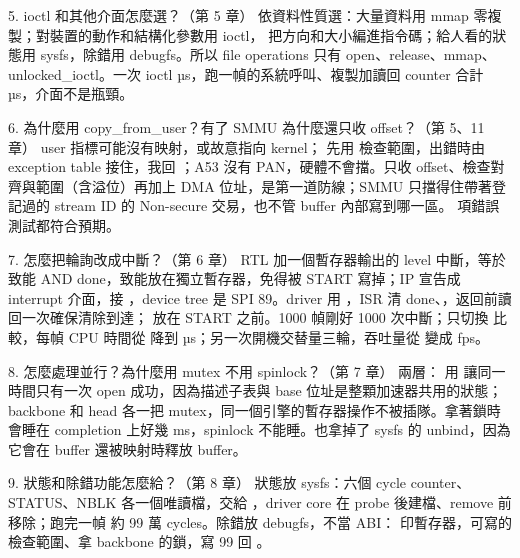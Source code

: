\begin{qashort}{5. ioctl 和其他介面怎麼選？（第 5 章）}
依資料性質選：大量資料用 mmap 零複製；對裝置的動作和結構化參數用 ioctl， 把方向和大小編進指令碼；給人看的狀態用 sysfs，除錯用 debugfs。所以 file operations 只有 open、release、mmap、unlocked\_ioctl。一次 ioctl \ioctlUs{} µs，跑一幀的系統呼叫、複製加讀回 counter 合計 \bbSysUs{} µs，介面不是瓶頸。
\end{qashort}

\begin{qashort}{6. 為什麼用 copy\_from\_user？有了 SMMU 為什麼還只收 offset？（第 5、11 章）}
user 指標可能沒有映射，或故意指向 kernel； 先用  檢查範圍，出錯時由 exception table 接住，我回 ；A53 沒有 PAN，硬體不會擋。只收 offset、檢查對齊與範圍（含溢位）再加上 DMA 位址，是第一道防線；SMMU 只擋得住帶著登記過的 stream ID 的 Non-secure 交易，也不管 buffer 內部寫到哪一區。\errChecks{} 項錯誤測試都符合預期。
\end{qashort}

\begin{qashort}{7. 怎麼把輪詢改成中斷？（第 6 章）}
RTL 加一個暫存器輸出的 level 中斷，等於致能 AND done，致能放在獨立暫存器，免得被 START 寫掉；IP 宣告成 interrupt 介面，接 ，device tree 是 SPI 89。driver 用 ，ISR 清 done、，返回前讀回一次確保清除到達； 放在 START 之前。1000 幀剛好 1000 次中斷；只切換  比較，每幀 CPU 時間從 \pollCpuUs{} 降到 \irqCpuUs{} µs；另一次開機交替量三輪，吞吐量從 \hPollFps{} 變成 \hIrqFps{} fps。
\end{qashort}

\begin{qashort}{8. 怎麼處理並行？為什麼用 mutex 不用 spinlock？（第 7 章）}
兩層： 用  讓同一時間只有一次 open 成功，因為描述子表與 base 位址是整顆加速器共用的狀態；backbone 和 head 各一把 mutex，同一個引擎的暫存器操作不被插隊。拿著鎖時會睡在 completion 上好幾 ms，spinlock 不能睡。也拿掉了 sysfs 的 unbind，因為它會在 buffer 還被映射時釋放 buffer。
\end{qashort}

\begin{qashort}{9. 狀態和除錯功能怎麼給？（第 8 章）}
狀態放 sysfs：六個 cycle counter、STATUS、NBLK 各一個唯讀檔，交給 ，driver core 在 probe 後建檔、remove 前移除；跑完一幀  約 99 萬 cycles。除錯放 debugfs，不當 ABI： 印暫存器，可寫的  檢查範圍、拿 backbone 的鎖，寫 99 回 。
\end{qashort}

